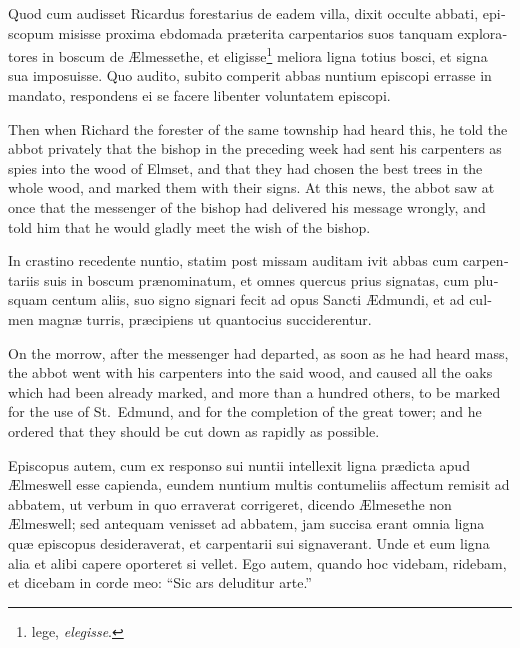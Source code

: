 \documentclass{book}
\begin{document}
\begin{paracol}{2}
\switchcolumn*

\begin{otherlanguage}{latin}
Quod cum audisset Ricardus forestarius de eadem villa, dixit occulte abbati, episcopum misisse proxima ebdomada pr\ae{}terita carpentarios suos tanquam exploratores in boscum de \AE{}lmessethe, et eligisse\footnote[\textdagger]{lege, \emph{elegisse}.} meliora ligna totius bosci, et signa sua imposuisse. Quo audito, subito comperit abbas nuntium episcopi errasse in mandato, respondens ei se facere libenter voluntatem episcopi. 
\end{otherlanguage}

\switchcolumn

Then when Richard the forester of the same township had heard this, he told the abbot privately that the bishop in the preceding week had sent his carpenters as spies into the wood of Elmset, and that they had chosen the best trees in the whole wood, and marked them with their signs. At this news, the abbot saw at once that the messenger of the bishop had delivered his message wrongly, and told him that he would gladly meet the wish of the bishop.

\switchcolumn*

\begin{otherlanguage}{latin}
In crastino recedente nuntio, statim post missam auditam ivit abbas cum carpentariis suis in boscum pr\ae{}nominatum, et omnes quercus prius signatas, cum plusquam centum aliis, suo signo signari fecit ad opus Sancti \AE{}dmundi, et ad culmen magn\ae{} turris, pr\ae{}cipiens ut quantocius succiderentur.
\end{otherlanguage}

\switchcolumn

On the morrow, after the messenger had departed, as soon as he had heard mass, the abbot went with his carpenters into the said wood, and caused all the oaks which had been already marked, and more than a hundred others, to be marked for the use of St.\ Edmund, and for the completion of the great tower; and he ordered that they should be cut down as rapidly as possible.

\switchcolumn*

\begin{otherlanguage}{latin}
Episcopus autem, cum ex responso sui nuntii intellexit ligna pr\ae{}dicta apud \AE{}lmeswell esse capienda, eundem nuntium multis contumeliis affectum remisit ad abbatem, ut verbum in quo erraverat corrigeret, dicendo \AE{}lmesethe non \AE{}lmeswell; sed antequam venisset ad abbatem, jam succisa erant omnia ligna qu\ae{} episcopus desideraverat, et carpentarii sui signaverant. Unde et eum ligna alia et alibi capere oporteret si vellet. Ego autem, quando hoc videbam, ridebam, et dicebam in corde meo: ``Sic ars deluditur arte.''
\end{otherlanguage}


\end{paracol}
\end{document}
